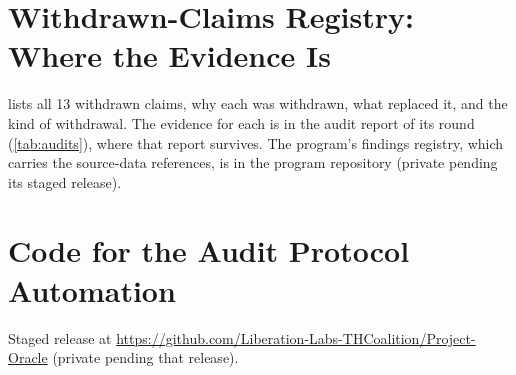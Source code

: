 \documentclass[11pt,letterpaper]{article}
\begin{document}
\section{Withdrawn-Claims Registry: Where the Evidence Is}\label{app:registry}

 lists all 13 withdrawn claims, why each was withdrawn, what replaced it, and the
kind of withdrawal. The evidence for each is in the audit report of its round (\cref{tab:audits}),
where that report survives. The program's findings registry, which carries the source-data
references, is in the program repository (private pending its staged release).

\section{Code for the Audit Protocol Automation}\label{app:code}

Staged release at \url{https://github.com/Liberation-Labs-THCoalition/Project-Oracle} (private
pending that release).
\end{document}
